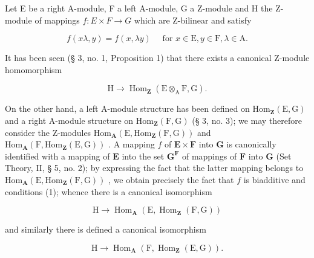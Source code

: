 Let E be a right A-module, F a left A-module, G a Z-module and H the Z-module of mappings \(f: E \times F \rightarrow G\) which are Z-bilinear and satisfy

\[
f (x \lambda , y) = f (x, \lambda y) \quad \text { for } x \in \mathrm{E}, y \in \mathrm{F}, \lambda \in \mathrm{A}.\tag{1}
\]

It has been seen (§ 3, no. 1, Proposition 1) that there exists a canonical Z-module homomorphism

\[
\mathrm{H} \rightarrow \operatorname{Hom} _ {\mathbf {Z}} (\mathrm{E} \otimes_ {\mathrm{A}} \mathrm{F}, \mathrm{G}).\tag{2}
\]

On the other hand, a left A-module structure has been defined on \(\mathrm{Hom}_{\mathbf{Z}}(\mathrm{E},\mathrm{G})\) and a right A-module structure on \(\mathrm{Hom}_{\mathbf{Z}}(\mathrm{F},\mathrm{G})\) (§ 3, no. 3); we may therefore consider the Z-modules \(\mathrm{Hom}_{\mathbf{A}}(\mathrm{E},\mathrm{Hom}_{\mathbf{Z}}(\mathrm{F},\mathrm{G}))\) and \(\mathrm{Hom}_{\mathbf{A}}(\mathrm{F},\mathrm{Hom}_{\mathbf{Z}}(\mathrm{E},\mathrm{G}))\) . A mapping \(f\) of \(\mathbf{E} \times \mathbf{F}\) into \(\mathbf{G}\) is canonically identified with a mapping of \(\mathbf{E}\) into the set \(\mathbf{G}^{\mathbf{F}}\) of mappings of \(\mathbf{F}\) into \(\mathbf{G}\) (Set Theory, II, § 5, no. 2); by expressing the fact that the latter mapping belongs to \(\mathrm{Hom}_{\mathbf{A}}(\mathrm{E},\mathrm{Hom}_{\mathbf{Z}}(\mathrm{F},\mathrm{G}))\) , we obtain precisely the fact that \(f\) is biadditive and conditions (1); whence there is a canonical isomorphism

\[
\mathrm{H} \rightarrow \operatorname{Hom} _ {\mathbf {A}} (\mathrm{E}, \operatorname{Hom} _ {\mathbf {Z}} (\mathrm{F}, \mathrm{G}))\tag{3}
\]

and similarly there is defined a canonical isomorphism

\[
\mathrm{H} \rightarrow \operatorname{Hom} _ {\mathbf {A}} (\mathrm{F}, \operatorname{Hom} _ {\mathbf {Z}} (\mathrm{E}, \mathrm{G})).\tag{4}
\]

